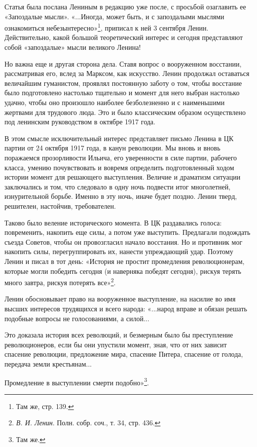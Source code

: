\documentclass[12pt, a4paper, openany]{book}
\begin{document}
Статья была послана Лениным в редакцию уже после, с просьбой озаглавить ее «Запоздалые мысли». «...Иногда, может быть, и с запоздалыми мыслями ознакомиться небезынтересно»\footnote{Там же, стр. 139.}, приписал к ней 3 сентября Ленин. Действительно, какой большой теоретический интерес и сегодня представляют собой «запоздалые» мысли великого Ленина!

Но важна еще и другая сторона дела. Ставя вопрос о вооруженном восстании, рассматривая его, вслед за Марксом, как искусство. Ленин продолжал оставаться величайшим гуманистом, проявлял постоянную заботу о том, чтобы восстание было подготовлено настолько тщательно и момент для него выбран настолько удачно, чтобы оно произошло наиболее безболезненно и с наименьшими жертвами для трудового люда. Это и было классическим образом осуществлено под ленинским руководством в октябре 1917 года.

В этом смысле исключительный интерес представляет письмо Ленина в ЦК партии от 24 октября 1917 года, в канун революции. Мы вновь и вновь поражаемся прозорливости Ильича, его уверенности в силе партии, рабочего класса, умению почувствовать и вовремя определить подготовленный ходом истории момент для решающего выступления. Величие и драматизм ситуации заключались и том, что следовало в одну ночь подвести итог многолетней, изнурительной борьбе. Именно в эту ночь, иначе будет поздно. Ленин тверд, решителен, настойчив, требователен.

Таково было веление исторического момента. В ЦК раздавались голоса: повременить, накопить еще силы, а потом уже выступить. Предлагали подождать съезда Советов, чтобы он провозгласил начало восстания. Но и противник мог накопить силы, перегруппировать их, нанести упреждающий удар. Поэтому Ленин и писал в тот день: «История не простит промедления революционерам, которые могли победить сегодня (и наверняка победят сегодня), рискуя терять много завтра, рискуя потерять все»\footnote{\textit{В. И. Ленин}. Полн. собр. соч., т. 34, стр. 436.}.

Ленин обосновывает право на вооруженное выступление, на насилие во имя высших интересов трудящихся и всего народа: «...народ вправе и обязан решать подобные вопросы не голосованиями, а силой...

Это доказала история всех революций, и безмерным было бы преступление революционеров, если бы они упустили момент, зная, что от них зависит спасение революции, предложение мира, спасение Питера, спасение от голода, передача земли крестьянам...

Промедление в выступлении смерти подобно»\footnote{Там же.}.
\end{document}
